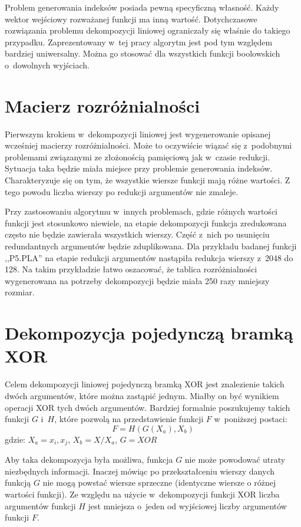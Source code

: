 Problem generowania indeksów posiada pewną specyficzną własność.
Każdy wektor wejściowy rozważanej funkcji ma inną wartość.
Dotychczasowe rozwiązania problemu dekompozycji liniowej ograniczały się właśnie do takiego przypadku.
Zaprezentowany w~tej pracy algorytm jest pod tym względem bardziej uniwersalny.
Można go stosować dla wszystkich funkcji boolowskich o~dowolnych wyjściach.

\section{Macierz rozróżnialności}

Pierwszym krokiem w~dekompozycji liniowej jest wygenerowanie opisanej wcześniej macierzy rozróżnialności.
Może to oczywiście wiązać się z~podobnymi problemami związanymi ze złożonością pamięciową jak w~czasie redukcji.
Sytuacja taka będzie miała miejsce przy problemie generowania indeksów.
Charakteryzuje się on tym,
że wszystkie wiersze funkcji mają różne wartości.
Z tego powodu liczba wierszy po redukcji argumentów nie zmaleje.

Przy zastosowaniu algorytmu w~innych problemach,
gdzie różnych wartości funkcji jest stosunkowo niewiele,
na etapie dekompozycji funkcja zredukowana często nie będzie zawierała wszystkich wierszy.
Część z~nich po usunięciu redundantnych argumentów będzie zduplikowana.
Dla przykładu badanej funkcji ,,P5.PLA'' na etapie redukcji argumentów nastąpiła redukcja wierszy z~2048 do 128.
Na takim przykładzie łatwo oszacować,
że tablica rozróżnialności wygenerowana na potrzeby dekompozycji będzie miała 250 razy mniejszy rozmiar.

\section{Dekompozycja pojedynczą bramką XOR}
\label{section:single-decomposition}
Celem dekompozycji liniowej pojedynczą bramką XOR jest znalezienie takich dwóch argumentów,
które można zastąpić jednym.
Miałby on być wynikiem operacji XOR tych dwóch argumentów.
Bardziej formalnie poszukujemy takich funkcji $G$ i~$H$,
które pozwolą na przedstawienie funkcji $F$ w~poniższej postaci:
\begin{equation}
F = H( G ( X_a ), X_b)
\end{equation}
gdzie: $X_a = {x_i, x_j}$, $X_b = X / X_a$, $G = XOR$

Aby taka dekompozycja była możliwa,
funkcja $G$ nie może powodować utraty niezbędnych informacji.
Inaczej mówiąc po przekształceniu wierszy danych funkcją $G$ nie mogą powstać wiersze sprzeczne (identyczne wiersze o różnej wartości funkcji).
Ze względu na użycie w~dekompozycji funkcji XOR liczba argumentów funkcji $H$ jest mniejsza o~jeden od wyjściowej liczby argumentów funkcji $F$.


